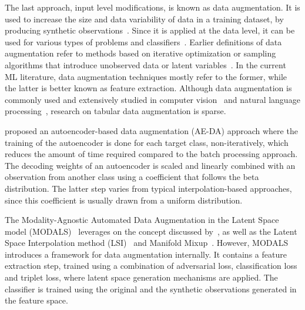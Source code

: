 \documentclass[parskip=full]{scrartcl}
\begin{document}
The last approach, input level modifications, is known as data augmentation.
It is used to increase the size and data variability of data in a training
dataset, by producing synthetic observations~\cite{Van2001, Wong2016}. Since
it is applied at the data level, it can be used for various types of problems
and classifiers~\cite{Behpour2019}.  Earlier definitions of data augmentation
refer to methods based on iterative optimization or sampling algorithms that
introduce unobserved data or latent variables~\cite{van2001art}. In the
current ML literature, data augmentation techniques mostly refer to the
former, while the latter is better known as feature extraction. Although data
augmentation is commonly used and extensively studied in computer
vision~\cite{shorten2019survey} and natural language
processing~\cite{feng2021survey}, research on tabular data augmentation is
sparse.

\citet{feng2020autuencoder} proposed an autoencoder-based data augmentation (AE-DA)
approach where the training of the autoencoder is done for each target class,
non-iteratively, which reduces the amount of time required compared to the
batch processing approach. The decoding weights of an autoencoder is 
scaled and linearly combined with an observation from another class using a
coefficient that follows the beta distribution. The latter step varies from
typical interpolation-based approaches, since this coefficient is usually
drawn from a uniform distribution.

The Modality-Agnostic Automated Data Augmentation in the Latent Space model
(MODALS)~\cite{cheung2020modals} leverages on the concept discussed
by~\citet{devries2017dataset}, as well as the Latent Space Interpolation
method (LSI)~\cite{liu2018data} and Manifold Mixup~\cite{verma2019manifold}.
However, MODALS introduces a framework for data augmentation internally. It
contains a feature extraction step, trained using a combination of adversarial
loss, classification loss and triplet loss, where latent space generation
mechanisms are applied. The classifier is trained using the original and the
synthetic observations generated in the feature space.



% 
% 
% 
\end{document}
